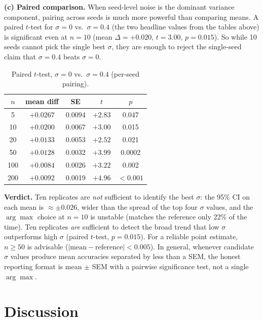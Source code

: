 \documentclass[11pt]{article}
\begin{document}
\textbf{(c) Paired comparison.} When seed-level noise is the dominant variance
component, pairing across seeds is much more powerful than comparing means. A
paired $t$-test for $\sigma{=}0$ vs.\ $\sigma{=}0.4$ (the two headline values
from the tables above) is significant even at $n{=}10$ (mean
$\Delta{=}{+}0.020$, $t{=}3.00$, $p{=}0.015$). So while 10 seeds cannot pick
the single best $\sigma$, they are enough to reject the single-seed claim
that $\sigma{=}0.4$ beats $\sigma{=}0$.

\begin{table}[h]
\centering
\begin{tabular}{ccccc}
\toprule
$n$ & mean diff & SE & $t$ & $p$ \\
\midrule
5   & $+0.0267$ & 0.0094 & $+2.83$ & 0.047 \\
10  & $+0.0200$ & 0.0067 & $+3.00$ & 0.015 \\
20  & $+0.0133$ & 0.0053 & $+2.52$ & 0.021 \\
50  & $+0.0128$ & 0.0032 & $+3.99$ & 0.0002 \\
100 & $+0.0084$ & 0.0026 & $+3.22$ & 0.002 \\
200 & $+0.0092$ & 0.0019 & $+4.96$ & $<0.001$ \\
\bottomrule
\end{tabular}
\caption{Paired $t$-test, $\sigma{=}0$ vs.\ $\sigma{=}0.4$ (per-seed pairing).}
\end{table}

\textbf{Verdict.} Ten replicates are \emph{not} sufficient to identify the
best $\sigma$: the 95\% CI on each mean is $\approx \pm 0.026$, wider than the
spread of the top four $\sigma$ values, and the $\arg\max$ choice at $n{=}10$
is unstable (matches the reference only 22\% of the time). Ten replicates
\emph{are} sufficient to detect the broad trend that low $\sigma$ outperforms
high $\sigma$ (paired $t$-test, $p{=}0.015$). For a reliable point estimate,
$n \geq 50$ is advisable ($|\text{mean} - \text{reference}| < 0.005$). In
general, whenever candidate $\sigma$ values produce mean accuracies separated
by less than a SEM, the honest reporting format is mean $\pm$ SEM with a
pairwise significance test, not a single $\arg\max$.

\section{Discussion}
\end{document}
